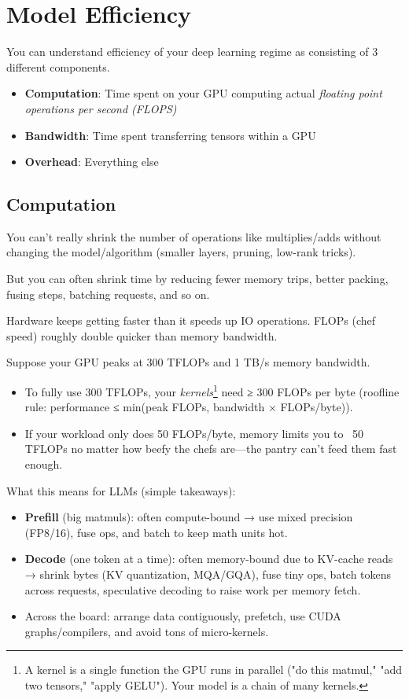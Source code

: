 \chapter{Model Efficiency}

You can understand efficiency of your deep learning regime as consisting of 3 different components.
\begin{itemize}
	\item \textbf{Computation}: Time spent on your GPU computing actual \textit{floating point operations per second (FLOPS)} 
	\item \textbf{Bandwidth}: Time spent transferring tensors within a GPU
	\item \textbf{Overhead}: Everything else
\end{itemize}

\section{Computation}

You can't really shrink the number of operations like multiplies/adds without changing the model/algorithm (\eg smaller layers, pruning, low-rank tricks).

But you can often shrink time by reducing fewer memory trips, better packing, fusing steps, batching requests, and so on. 

Hardware keeps getting faster than it speeds up IO operations. FLOPs (chef speed) roughly double quicker than memory bandwidth.

Suppose your GPU peaks at 300 TFLOPs and 1 TB/s memory bandwidth.
\begin{itemize}
	\item To fully use 300 TFLOPs, your \textit{kernels}\footnote{A kernel is a single function the GPU runs in parallel (\eg "do this matmul," "add two tensors," "apply GELU"). Your model is a chain of many kernels.} need ≥ 300 FLOPs per byte (roofline rule: performance ≤ min(peak FLOPs, bandwidth × FLOPs/byte)).
	\item If your workload only does 50 FLOPs/byte, memory limits you to ~50 TFLOPs no matter how beefy the chefs are—the pantry can't feed them fast enough.
\end{itemize}


What this means for LLMs (simple takeaways):
\begin{itemize}
	\item \textbf{Prefill} (big matmuls): often compute-bound → use mixed precision (FP8/16), fuse ops, and batch to keep math units hot.
	\item \textbf{Decode} (one token at a time): often memory-bound due to KV-cache reads → shrink bytes (KV quantization, MQA/GQA), fuse tiny ops, batch tokens across requests, speculative decoding to raise work per memory fetch.
	\item Across the board: arrange data contiguously, prefetch, use CUDA graphs/compilers, and avoid tons of micro-kernels.
\end{itemize}

